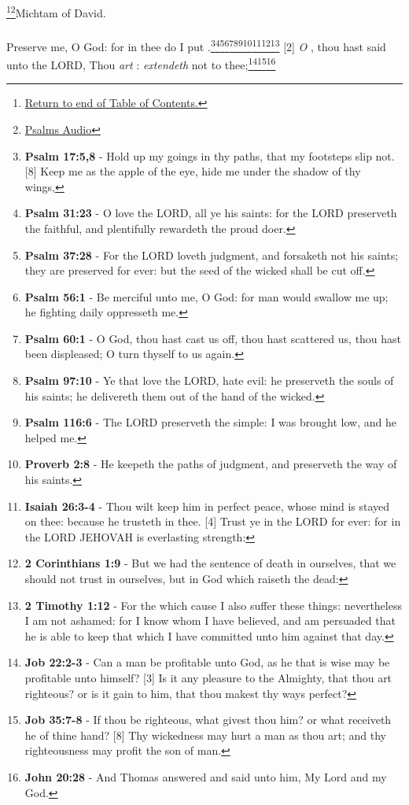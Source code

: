 \footnote{\textcolor[cmyk]{0.99998,1,0,0}{\hyperlink{TOC}{Return to end of Table of Contents.}}}\footnote{\href{https://www.audioverse.org/english/audiobibles/books/ENGKJV/O/Ps/1}{\textcolor[cmyk]{0.99998,1,0,0}{Psalms Audio}}}\textcolor[cmyk]{0.99998,1,0,0}{Michtam of David.}\\
\\
\textcolor[cmyk]{0.99998,1,0,0}{Preserve me, O God: for in thee do I put .}\footnote{\textbf{Psalm 17:5,8} - Hold up my goings in thy paths, that my footsteps slip not. [8] Keep me as the apple of the eye, hide me under the shadow of thy wings,}\footnote{\textbf{Psalm 31:23} - O love the LORD, all ye his saints: for the LORD preserveth the faithful, and plentifully rewardeth the proud doer.}\footnote{\textbf{Psalm 37:28} - For the LORD loveth judgment, and forsaketh not his saints; they are preserved for ever: but the seed of the wicked shall be cut off.}\footnote{\textbf{Psalm 56:1} - Be merciful unto me, O God: for man would swallow me up; he fighting daily oppresseth me.}\footnote{\textbf{Psalm 60:1} - O God, thou hast cast us off, thou hast scattered us, thou hast been displeased; O turn thyself to us again.}\footnote{\textbf{Psalm 97:10} - Ye that love the LORD, hate evil: he preserveth the souls of his saints; he delivereth them out of the hand of the wicked.}\footnote{\textbf{Psalm 116:6} - The LORD preserveth the simple: I was brought low, and he helped me.}\footnote{\textbf{Proverb 2:8} - He keepeth the paths of judgment, and preserveth the way of his saints.}\footnote{\textbf{Isaiah 26:3-4} - Thou wilt keep him in perfect peace, whose mind is stayed on thee: because he trusteth in thee. [4] Trust ye in the LORD for ever: for in the LORD JEHOVAH is everlasting strength:}\footnote{\textbf{2 Corinthians 1:9} - But we had the sentence of death in ourselves, that we should not trust in ourselves, but in God which raiseth the dead:}\footnote{\textbf{2 Timothy 1:12} - For the which cause I also suffer these things: nevertheless I am not ashamed: for I know whom I have believed, and am persuaded that he is able to keep that which I have committed unto him against that day.}
[2] \textcolor[cmyk]{0.99998,1,0,0}{\emph{O} , thou hast said unto the LORD, Thou \emph{art} :  \emph{extendeth} not to thee;}\footnote{\textbf{Job 22:2-3} - Can a man be profitable unto God, as he that is wise may be profitable unto himself? [3] Is it any pleasure to the Almighty, that thou art righteous? or is it gain to him, that thou makest thy ways perfect?}\footnote{\textbf{Job 35:7-8} - If thou be righteous, what givest thou him? or what receiveth he of thine hand? [8] Thy wickedness may hurt a man as thou art; and thy righteousness may profit the son of man.}\footnote{\textbf{John 20:28} - And Thomas answered and said unto him, My Lord and my God.}
